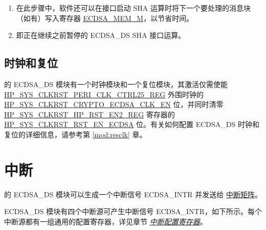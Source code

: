 \documentclass[main\_\_CN.tex]{subfiles}
\begin{document}
\begin{tiplisting}\label{others:ecdsa-note-sha}
\vspace{-2.5em}
\begin{enumerate}
\item 在此步骤中，软件还可以在接口启动 SHA 运算时将下一个要处理的消息块（如有）写入寄存器 \hyperref[tab:ecdsa-memory]{ECDSA\_MEM\_M}，以节省时间。
\item 即正在继续之前暂停的 ECDSA\_DS SHA 接口运算。
\end{enumerate}
\end{tiplisting}

\subsection{时钟和复位}

\chipname{} 的 ECDSA\_DS 模块有一个时钟模块和一个复位模块，其激活仅需使能 \hyperref[regdesc:HPSYSCLKRSTPERICLKCTRL25REG]{HP\_SYS\_CLKRST\_PERI\_CLK\_CTRL25\_REG} 外围时钟的 \hyperref[fielddesc:HPSYSCLKRSTCRYPTOECDSACLKEN]{HP\_SYS\_CLKRST\_CRYPTO\_ECDSA\_CLK\_EN} 位，并同时清零 \hyperref[regdesc:HPSYSCLKRSTHPRSTEN2REG]{HP\_SYS\_CLKRST\_HP\_RST\_EN2\_REG} 寄存器的 \hyperref[fielddesc:HPSYSCLKRSTRSTENECDSA]{HP\_SYS\_CLKRST\_RST\_EN\_ECDSA} 位。有关如何配置 ECDSA\_DS 时钟和复位的详细信息，请参考第 \ref{mod:resclk} 章\textit{}。

\section{中断}
\label{sec:ecdsa-interrupt}

\chipname{} 的 ECDSA\_DS 模块可以生成一个中断信号 ECDSA\_INTR 并发送给 \hyperref[mod:intmtrx]{中断矩阵}。

ECDSA\_DS 模块有四个中断源可产生中断信号 ECDSA\_INTR，如下所示。每个中断源都有一组通用的配置寄存器，详见章节 \hyperref[interrupt-config-registers]{\textit{中断配置寄存器}}。
\end{document}
